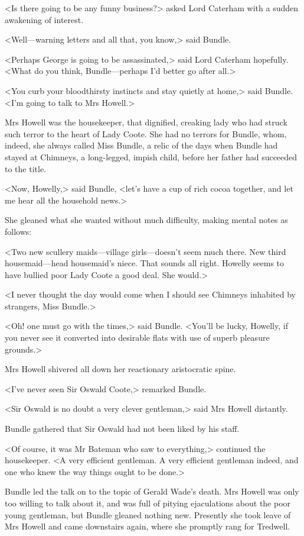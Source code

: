 <Is there going to be any funny business?> asked Lord Caterham with a sudden awakening of interest.

<Well—warning letters and all that, you know,> said Bundle.

<Perhaps George is going to be assassinated,> said Lord Caterham hopefully. <What do you think, Bundle—perhaps I'd better go after all.>

<You curb your bloodthirsty instincts and stay quietly at home,> said Bundle. <I'm going to talk to Mrs Howell.>

Mrs Howell was the housekeeper, that dignified, creaking lady who had struck such terror to the heart of Lady Coote. She had no terrors for Bundle, whom, indeed, she always called Miss Bundle, a relic of the days when Bundle had stayed at Chimneys, a long-legged, impish child, before her father had succeeded to the title.

<Now, Howelly,> said Bundle, <let's have a cup of rich cocoa together, and let me hear all the household news.>

She gleaned what she wanted without much difficulty, making mental notes as follows:

<Two new scullery maids—village girls—doesn't seem much there. New third housemaid—head housemaid's niece. That sounds all right. Howelly seems to have bullied poor Lady Coote a good deal. She would.>

<I never thought the day would come when I should see Chimneys inhabited by strangers, Miss Bundle.>

<Oh! one must go with the times,> said Bundle. <You'll be lucky, Howelly, if you never see it converted into desirable flats with use of superb pleasure grounds.>

Mrs Howell shivered all down her reactionary aristocratic spine.

<I've never seen Sir Oswald Coote,> remarked Bundle.

<Sir Oswald is no doubt a very clever gentleman,> said Mrs Howell distantly.

Bundle gathered that Sir Oswald had not been liked by his staff.

<Of course, it was Mr Bateman who saw to everything,> continued the housekeeper. <A very efficient gentleman. A very efficient gentleman indeed, and one who knew the way things ought to be done.>

Bundle led the talk on to the topic of Gerald Wade's death. Mrs Howell was only too willing to talk about it, and was full of pitying ejaculations about the poor young gentleman, but Bundle gleaned nothing new. Presently she took leave of Mrs Howell and came downstairs again, where she promptly rang for Tredwell.

